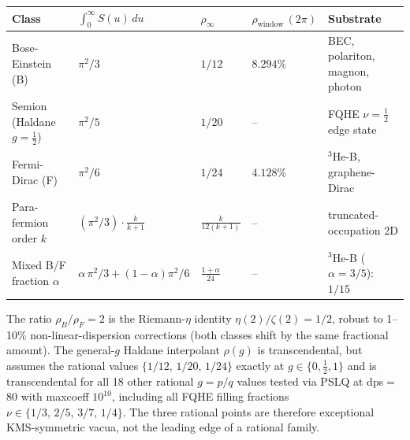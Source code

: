 \documentclass[reprint,amsmath,amssymb,aps,prd,superscriptaddress]{revtex4-2}
\providecommand{\1}{\mathbf{1}}
\begin{document}
\begin{center}
\begin{tabular}{@{}lllll@{}}
\hline
Class & $\int_0^\infty S(u)\,du$ & $\rho_\infty$ & $\rho_\mathrm{window}\,(2\pi)$ & Substrate \\
\hline
Bose-Einstein (B)                   & $\pi^2/3$                        & $1/12$              & $8.294\%$ & BEC, polariton, magnon, photon \\
Semion (Haldane $g{=}\tfrac{1}{2}$) & $\pi^2/5$                        & $1/20$              & --        & FQHE $\nu{=}\tfrac{1}{2}$ edge state \\
Fermi-Dirac (F)                     & $\pi^2/6$                        & $1/24$              & $4.128\%$ & $^3$He-B, graphene-Dirac \\
Para-fermion order $k$              & $(\pi^2/3)\cdot\tfrac{k}{k+1}$   & $\tfrac{k}{12(k+1)}$ & --       & truncated-occupation 2D \\
Mixed B/F fraction $\alpha$         & $\alpha\,\pi^2/3 + (1{-}\alpha)\pi^2/6$ & $\tfrac{1+\alpha}{24}$ & --   & $^3$He-B ($\alpha{=}3/5$): $1/15$ \\
\hline
\end{tabular}
\end{center}

The ratio $\rho_B/\rho_F = 2$ is the Riemann-$\eta$ identity $\eta(2)/\zeta(2)=1/2$, robust to
1--10\% non-linear-dispersion corrections (both classes shift by the same fractional amount).
The general-$g$ Haldane interpolant $\rho(g)$ is transcendental, but assumes the rational
values $\{1/12,\,1/20,\,1/24\}$ exactly at $g\in\{0,\tfrac{1}{2},1\}$ and is transcendental for
all 18 other rational $g{=}p/q$ values tested via PSLQ at dps$=$80 with maxcoeff $10^{10}$,
including all FQHE filling fractions $\nu \in \{1/3,\,2/5,\,3/7,\,1/4\}$. The three rational
points are therefore exceptional KMS-symmetric vacua, not the leading edge of a rational family.
\end{document}
